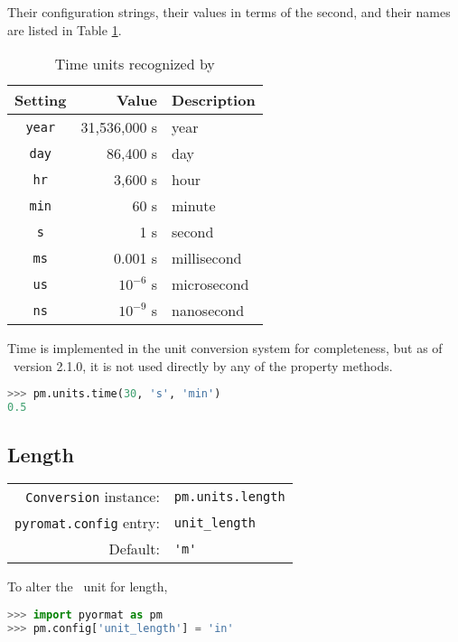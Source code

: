 Their configuration strings, their values in terms of the second, and their names are listed in Table \ref{tab:time}.

\begin{table}
\centering
\caption{Time units recognized by \PM}\label{tab:time}
\begin{tabular}{crl}
\hline
Setting & Value & Description\\
\hline
\verb|year| & 31,536,000 s & year\\
\verb|day| & 86,400 s & day\\
\verb|hr| & 3,600 s & hour\\
\verb|min| & 60 s & minute\\
\verb|s| & 1 s & second\\
\verb|ms| & 0.001 s & millisecond\\
\verb|us| & $10^{-6}$ s & microsecond\\
\verb|ns| & $10^{-9}$ s & nanosecond\\
\hline
\end{tabular}
\end{table}

Time is implemented in the unit conversion system for completeness, but as of \PM\ version 2.1.0, it is not used directly by any of the property methods.

\begin{lstlisting}[language=Python, caption=Time Conversion Example]
>>> pm.units.time(30, 's', 'min')
0.5
\end{lstlisting}

%
%

\subsection{Length}\label{sec:units:length}

\begin{tabular}{rl}
\hline
\verb|Conversion| instance: & \verb|pm.units.length|\\
\verb|pyromat.config| entry: & \verb|unit_length|\\
Default: & \verb|'m'|\\
\hline
\end{tabular}
\vspace{1em}

To alter the \PM\ unit for length,
\begin{lstlisting}[language=Python]
>>> import pyormat as pm
>>> pm.config['unit_length'] = 'in'
\end{lstlisting}

